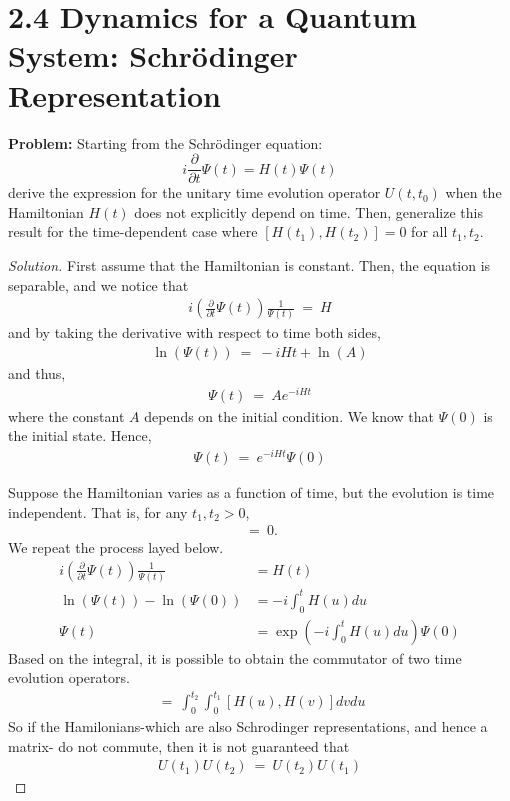 \documentclass{article}
\numberwithin{equation}{section}
\newcommand{\pderiv}[1]{
    {
        \frac {\partial}{\partial{#1}}
    }
}
\begin{document}
\section*{2.4 Dynamics for a Quantum System: Schrödinger Representation}

\textbf{Problem:}  
Starting from the Schrödinger equation:
\[
i \frac{\partial}{\partial t} \Psi(t) = H(t) \Psi(t)
\]
derive the expression for the unitary time evolution operator \( U(t, t_0) \) when the Hamiltonian \( H(t) \) does not explicitly depend on time. Then, generalize this result for the time-dependent case where \( [H(t_1), H(t_2)] = 0 \) for all \( t_1, t_2 \).

\begin{proof}[Solution]
    First assume that the Hamiltonian is constant. Then, the equation is 
    separable, and we notice that 
    \begin{align}
        i\left(\pderiv{t} \Psi(t) \right)\frac 1 {\Psi(t)} \ = \ H 
    \end{align}
    and by taking the derivative with respect to time both sides, 
    \begin{align}
        \ln\left(
            \Psi(t)
        \right) \ = \  
        -i Ht + \ln(A)
    \end{align}
    and thus, 
    \begin{align}
        \Psi(t) \ = \ A e^{-iHt}
    \end{align}
    where the constant $A$ depends on the initial condition. We know 
    that $\Psi(0)$ is the initial state. Hence, 
    \begin{align}
        \Psi(t) \ = \ e^{-iHt} \Psi(0)
    \end{align}

    Suppose the Hamiltonian varies as a function of time, but the 
    evolution is time independent. That is, for any $t_1,t_2 > 0$, 
    \begin{align}
        [U(t_1), U(t_2)] \ = \ 0.
    \end{align}
    We repeat the process layed below. 
    \begin{align}
        i\left(\pderiv t \Psi(t) \right)\frac 1 {\Psi(t)} & = H(t) \\ 
        \ln(\Psi(t)) - \ln(\Psi(0)) & = -i\int_{0}^t H(u) du \\ 
        \Psi(t) & = \exp\left(
            -i\int_{0}^t H(u) du
        \right)\Psi(0)
    \end{align}
    Based on the integral, it is possible to obtain the commutator 
    of two time evolution operators. 
    \begin{align}
        [U(t_1), U(t_2)] \ =  
        \ \int_{0}^{t_2} \int_0^{t_1} [H(u), H(v)]dv du
    \end{align}
    So if the Hamilonians-which are also Schrodinger representations, 
    and hence a matrix-
    do not commute, then it is not guaranteed that 
    \begin{align}
        U(t_1)U(t_2) \ = \ U(t_2)U(t_1)
    \end{align}
\end{proof}
\end{document}
